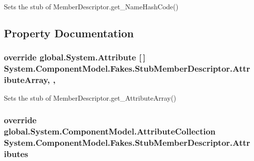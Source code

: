 Sets the stub of Member\-Descriptor.\-get\-\_\-\-Name\-Hash\-Code()



\subsection{Property Documentation}
\hypertarget{class_system_1_1_component_model_1_1_fakes_1_1_stub_member_descriptor_a67a8fb481380e0b1136cdb2bc61874b2}{
\subsubsection[{Attribute\-Array}]{\setlength{\rightskip}{0pt plus 5cm}override global.\-System.\-Attribute \mbox{[}$\,$\mbox{]} System.\-Component\-Model.\-Fakes.\-Stub\-Member\-Descriptor.\-Attribute\-Array\hspace{0.3cm}{\ttfamily [get]}, {\ttfamily [set]}, {\ttfamily [protected]}}}\label{class_system_1_1_component_model_1_1_fakes_1_1_stub_member_descriptor_a67a8fb481380e0b1136cdb2bc61874b2}


Sets the stub of Member\-Descriptor.\-get\-\_\-\-Attribute\-Array()

\hypertarget{class_system_1_1_component_model_1_1_fakes_1_1_stub_member_descriptor_a85087da9687b9aed638c57575aea2352}{
\subsubsection[{Attributes}]{\setlength{\rightskip}{0pt plus 5cm}override global.\-System.\-Component\-Model.\-Attribute\-Collection System.\-Component\-Model.\-Fakes.\-Stub\-Member\-Descriptor.\-Attributes\hspace{0.3cm}{\ttfamily [get]}}}\label{class_system_1_1_component_model_1_1_fakes_1_1_stub_member_descriptor_a85087da9687b9aed638c57575aea2352}


